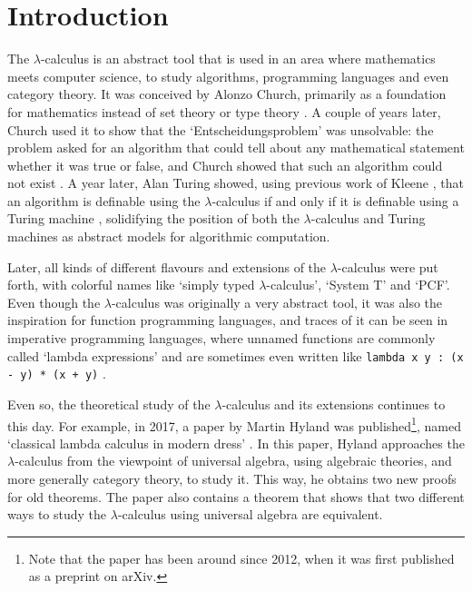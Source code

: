 \chapter{Introduction}

The $ \lambda $-calculus is an abstract tool that is used in an area where mathematics meets computer science, to study algorithms, programming languages and even category theory. It was conceived by Alonzo Church, primarily as a foundation for mathematics instead of set theory or type theory \autocite{church-lambda-calculus}. A couple of years later, Church used it to show that the `Entscheidungsproblem' was unsolvable: the problem asked for an algorithm that could tell about any mathematical statement whether it was true or false, and Church showed that such an algorithm could not exist \autocite{church-number-theory}. A year later, Alan Turing showed, using previous work of Kleene \autocite{kleene-lambda}, that an algorithm is definable using the $ \lambda $-calculus if and only if it is definable using a Turing machine \autocite{turing-lambda}, solidifying the position of both the $ \lambda $-calculus and Turing machines as abstract models for algorithmic computation.

Later, all kinds of different flavours and extensions of the $ \lambda $-calculus were put forth, with colorful names like `simply typed $ \lambda $-calculus', `System T' and `PCF'. Even though the $ \lambda $-calculus was originally a very abstract tool, it was also the inspiration for function programming languages, and traces of it can be seen in imperative programming languages, where unnamed functions are commonly called `lambda expressions' \autocite{java-lambdas} and are sometimes even written like \texttt{lambda x y : (x - y) * (x + y)} \autocite{python-expressions}.

Even so, the theoretical study of the $ \lambda $-calculus and its extensions continues to this day. For example, in 2017, a paper by Martin Hyland was published\footnote{Note that the paper has been around since 2012, when it was first published as a preprint on arXiv.}, named `classical lambda calculus in modern dress' \autocite{Hyland}. In this paper, Hyland approaches the $ \lambda $-calculus from the viewpoint of universal algebra, using algebraic theories, and more generally category theory, to study it. This way, he obtains two new proofs for old theorems. The paper also contains a theorem that shows that two different ways to study the $ \lambda $-calculus using universal algebra are equivalent.

